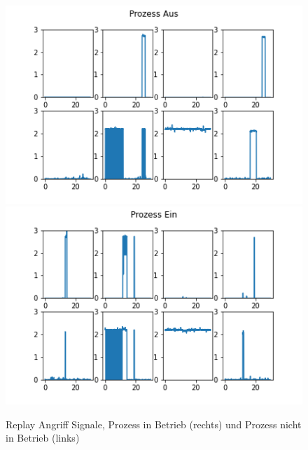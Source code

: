 \documentclass[12pt,a4paper]{scrartcl}
\numberwithin{equation}{section}
\begin{document}
\begin{figure}[ht!]
	\centering
	  \includegraphics[scale=0.5]{replay_angriff.png}
	  \includegraphics[scale=0.5]{replay_angriff_process_on.png}
	  \caption{Replay Angriff Signale, Prozess in Betrieb (rechts) und Prozess nicht in Betrieb (links)}
	\label{replay}
\end{figure}
\end{document}
